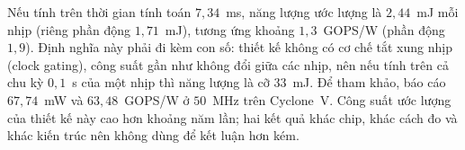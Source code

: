 Nếu tính trên thời gian tính toán $7{,}34$~ms, năng lượng ước lượng là $2{,}44$~mJ mỗi nhịp (riêng phần động $1{,}71$~mJ), tương ứng khoảng $1{,}3$~GOPS/W (phần động $1{,}9$).
Định nghĩa này phải đi kèm con số: thiết kế không có cơ chế tắt xung nhịp (clock gating), công suất gần như không đổi giữa các nhịp, nên nếu tính trên cả chu kỳ $0{,}1$~s của một nhịp thì năng lượng là cỡ $33$~mJ.
Để tham khảo, \cite{liu2023fully} báo cáo $67{,}74$~mW và $63{,}48$~GOPS/W ở $50$~MHz trên Cyclone~V.
Công suất ước lượng của thiết kế này cao hơn khoảng năm lần; hai kết quả khác chip, khác cách đo và khác kiến trúc nên không dùng để kết luận hơn kém.
